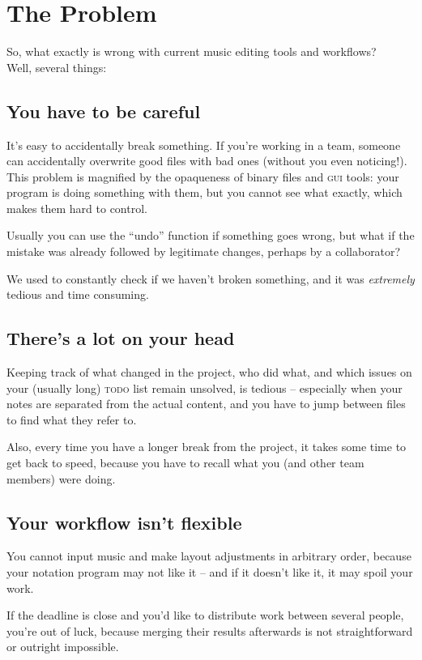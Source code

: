 \documentclass[11pt,a4paper]{article}
\begin{document}
\section{The Problem}
So, what exactly is wrong with current music editing tools and workflows?\\
Well, several things:

\subsection{You have to be careful}
It's easy to accidentally break something. If you're working in a team,
someone can accidentally overwrite good files with bad ones (without you even noticing!).
This problem is magnified by the opaqueness of binary files and \textsc{gui}
tools: your program is doing something with them, but you cannot see what exactly,
which makes them hard to control.

Usually you can use the “undo” function if something goes wrong,
but what if the mistake was already followed by legitimate changes, perhaps
by a collaborator?

We used to constantly check if we haven't broken something,
and it was \emph{extremely} tedious and time consuming.

\subsection{There's a lot on your head}
Keeping track of what changed in the project, who did what,
and which issues on your (usually long) \textsc{todo} list remain
unsolved, is tedious -- especially when your notes are separated from
the actual content, and you have to jump between files to find
what they refer to.

Also, every time you have a longer break from the project, it takes some
time to get back to speed, because you have to recall what you
(and other team members) were doing.

\subsection{Your workflow isn't flexible}
You cannot input music and make layout adjustments in arbitrary order, because
your notation program may not like it -- and if it doesn't like it,
it may spoil your work.

If the deadline is close and you'd like to distribute work between several people,
you're out of luck, because merging their results afterwards is not straightforward
or outright impossible.
\end{document}
